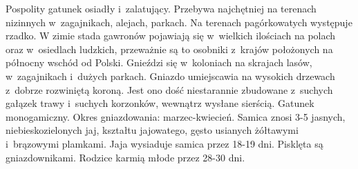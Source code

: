 \documentclass[a4paper,10pt]{report}
\begin{document}
Pospolity gatunek osiadły i~zalatujący. Przebywa najchętniej na terenach nizinnych w~zagajnikach, alejach, parkach. Na terenach pagórkowatych występuje rzadko. W zimie stada gawronów pojawiają się w~wielkich ilościach na polach oraz w~osiedlach ludzkich, przeważnie są to osobniki z~krajów położonych na północny wschód od Polski. Gnieździ się w~koloniach na skrajach lasów, w~zagajnikach i~dużych parkach. Gniazdo umiejscawia na wysokich drzewach z~dobrze rozwiniętą koroną. Jest ono dość niestarannie zbudowane z~suchych gałązek trawy i~suchych korzonków, wewnątrz wysłane sierścią. Gatunek monogamiczny. Okres gniazdowania: marzec-kwiecień. Samica znosi 3-5 jasnych, niebieskozielonych jaj, kształtu jajowatego, gęsto usianych żółtawymi i~brązowymi plamkami. Jaja wysiaduje samica przez 18-19 dni. Pisklęta są gniazdownikami. Rodzice karmią młode przez 28-30 dni. 
\end{document}

